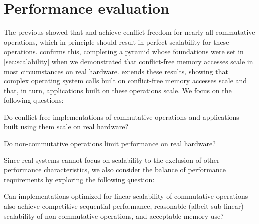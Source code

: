 \section{Performance evaluation}
\label{sec:eval}



The previous  showed that \fs and \vm achieve
conflict-freedom for nearly all commutative operations, which in
principle should result in perfect scalability for these operations.
%
 confirms this, completing a pyramid whose
foundations were set in \cref{sec:scalability} when we demonstrated
that conflict-free memory accesses scale in most circumstances on real
hardware.
%
 extends these results, showing that complex
operating system calls built on conflict-free memory accesses scale
and that, in turn, applications built on these operations scale.
%
We focus on the following questions:

\begin{CompactItemize}

\item Do conflict-free implementations of commutative operations and
  applications built using them scale on real hardware?

\item Do non-commutative operations limit performance on real
  hardware?


\end{CompactItemize}

Since real systems cannot focus on scalability to the exclusion of
other performance characteristics, we also consider the balance of
performance requirements by exploring the following question:

\begin{CompactItemize}

\item Can implementations optimized for linear scalability of
  commutative operations also achieve competitive sequential
  performance, reasonable (albeit sub-linear) scalability of
  non-commutative operations, and acceptable memory use?

\end{CompactItemize}


